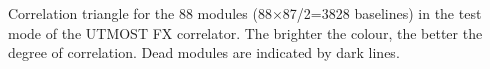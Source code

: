 Correlation triangle for the 88 modules (88$\times$87/2=3828 baselines) in the test mode of the UTMOST FX correlator. The brighter the colour, the better the degree of correlation. Dead modules are indicated by dark lines.